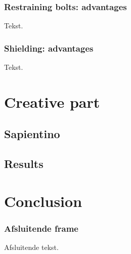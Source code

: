 \documentclass[kul]{kulakbeamer}
\begin{document}
\begin{frame}
\frametitle{Restraining bolts: advantages}
Tekst.
\end{frame}

\begin{frame}
\frametitle{Shielding: advantages}
Tekst.
\end{frame}

\section{Creative part}
\subsection{Sapientino}
\subsection{Results}
\section{Conclusion}
\begin{frame}
\frametitle{Afsluitende frame}
Afsluitende tekst.
\end{frame}
\end{document}
